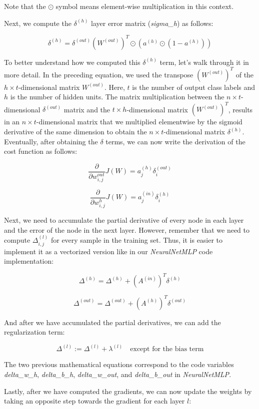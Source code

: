 \documentclass[11pt]{article}
\begin{document}
Note that the \(\odot\) symbol means element-wise multiplication in this
context.

    Next, we compute the \(\delta^{(h)}\) layer error matrix
(\emph{sigma\_h}) as follows:

\[\delta^{(h)} = \delta^{(out)} (W^{(out)})^T \odot (a^{(h)} \odot (1 - a^{(h)}))\]

To better understand how we computed this \(\delta^{(h)}\) term, let's
walk through it in more detail. In the preceding equation, we used the
transpose \((W^{(out)})^T\) of the \(h \times t\)-dimensional matrix
\(W^{(out)}\). Here, \(t\) is the number of output class labels and
\(h\) is the number of hidden units. The matrix multiplication between
the \(n \times t\)-dimensional \(\delta^{(out)}\) matrix and the
\(t \times h\)-dimensional matrix \((W^{(out)})^T\), results in an
\(n \times t\)-dimensional matrix that we multiplied elementwise by the
sigmoid derivative of the same dimension to obtain the
\(n \times t\)-dimensional matrix \(\delta^{(h)}\). Eventually, after
obtaining the \(\delta\) terms, we can now write the derivation of the
cost function as follows:

\[\frac{\partial}{\partial w_{i,j}^{out}} J(W) = a_j^{(h)} \delta_i^{(out)}\]

\[\frac{\partial}{\partial w_{i,j}^{h}} J(W) = a_j^{(in)} \delta_i^{(h)}\]

Next, we need to accumulate the partial derivative of every node in each
layer and the error of the node in the next layer. However, remember
that we need to compute \(\Delta_{i,j}^{(l)}\) for every sample in the
training set. Thus, it is easier to implement it as a vectorized version
like in our \emph{NeuralNetMLP} code implementation:

\[\Delta^{(h)} = \Delta^{(h)} + (A^{(in)})^T \delta^{(h)}\]

\[\Delta^{(out)} = \Delta^{(out)} + (A^{(h)})^T \delta^{(out)}\]

And after we have accumulated the partial derivatives, we can add the
regularization term:

\[\Delta^{(l)} := \Delta^{(l)} + \lambda^{(l)} \quad \text{except for the bias term}\]

The two previous mathematical equations correspond to the code variables
\emph{delta\_w\_h}, \emph{delta\_b\_h}, \emph{delta\_w\_out}, and
\emph{delta\_b\_out} in \emph{NeuralNetMLP}.

Lastly, after we have computed the gradients, we can now update the
weights by taking an opposite step towards the gradient for each layer
\(l\):
\end{document}
